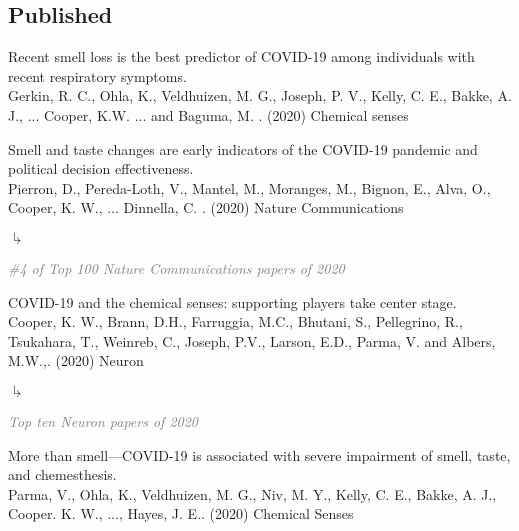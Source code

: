 \documentclass[10pt]{cooperCV2}
\begin{document}
\subsection{Published} 
\begin{etaremune}[resume,itemindent=-1.5\bibhang, topsep=0pt,
				   itemsep=\bibsep,partopsep=0pt,parsep=0pt,leftmargin={\bibhang+\widthof{[999]}}] 
    
    \item Recent smell loss is the best predictor of COVID-19 among individuals with recent respiratory symptoms. \\
     Gerkin, R. C., Ohla, K., Veldhuizen, M. G., Joseph, P. V., Kelly, C. E., Bakke, A. J., ... Cooper, K.W. ... and Baguma, M. . (2020) Chemical senses 
     
	
    \item Smell and taste changes are early indicators of the COVID-19 pandemic and political decision effectiveness. \\
     Pierron, D., Pereda-Loth, V., Mantel, M., Moranges, M., Bignon, E., Alva, O.,  Cooper, K. W., ... Dinnella, C. . (2020) Nature Communications 
     
     	\begin{list}{$\drsh$}{}
     	
	      \item \textcolor{grey}{\textit{\#4 of Top 100 Nature Communications papers of 2020} }
     	
     	\end{list} 
     
	
    \item COVID-19 and the chemical senses: supporting players take center stage. \\
     Cooper, K. W., Brann, D.H., Farruggia, M.C., Bhutani, S., Pellegrino, R., Tsukahara, T., Weinreb, C., Joseph, P.V., Larson, E.D., Parma, V. and Albers, M.W.,. (2020) Neuron 
     
     	\begin{list}{$\drsh$}{}
     	
	      \item \textcolor{grey}{\textit{Top ten Neuron papers of 2020} }
     	
     	\end{list} 
     
	
    \item More than smell—COVID-19 is associated with severe impairment of smell, taste, and chemesthesis. \\
     Parma, V., Ohla, K., Veldhuizen, M. G., Niv, M. Y., Kelly, C. E., Bakke, A. J., Cooper. K. W., ..., Hayes, J. E.. (2020) Chemical Senses 
     

\end{etaremune}
\end{document}
